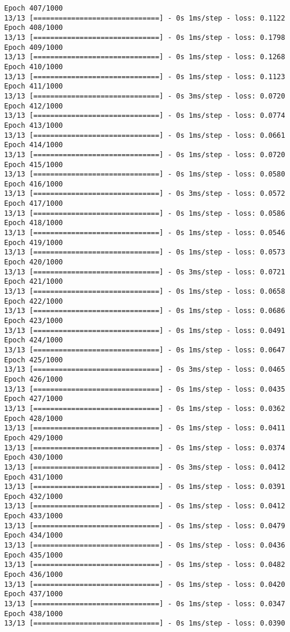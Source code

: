 \documentclass[11pt]{article}
\begin{document}
\begin{Verbatim}[commandchars=\\\{\}]
Epoch 407/1000
13/13 [==============================] - 0s 1ms/step - loss: 0.1122
Epoch 408/1000
13/13 [==============================] - 0s 1ms/step - loss: 0.1798
Epoch 409/1000
13/13 [==============================] - 0s 1ms/step - loss: 0.1268
Epoch 410/1000
13/13 [==============================] - 0s 1ms/step - loss: 0.1123
Epoch 411/1000
13/13 [==============================] - 0s 3ms/step - loss: 0.0720
Epoch 412/1000
13/13 [==============================] - 0s 1ms/step - loss: 0.0774
Epoch 413/1000
13/13 [==============================] - 0s 1ms/step - loss: 0.0661
Epoch 414/1000
13/13 [==============================] - 0s 1ms/step - loss: 0.0720
Epoch 415/1000
13/13 [==============================] - 0s 1ms/step - loss: 0.0580
Epoch 416/1000
13/13 [==============================] - 0s 3ms/step - loss: 0.0572
Epoch 417/1000
13/13 [==============================] - 0s 1ms/step - loss: 0.0586
Epoch 418/1000
13/13 [==============================] - 0s 1ms/step - loss: 0.0546
Epoch 419/1000
13/13 [==============================] - 0s 1ms/step - loss: 0.0573
Epoch 420/1000
13/13 [==============================] - 0s 3ms/step - loss: 0.0721
Epoch 421/1000
13/13 [==============================] - 0s 1ms/step - loss: 0.0658
Epoch 422/1000
13/13 [==============================] - 0s 1ms/step - loss: 0.0686
Epoch 423/1000
13/13 [==============================] - 0s 1ms/step - loss: 0.0491
Epoch 424/1000
13/13 [==============================] - 0s 1ms/step - loss: 0.0647
Epoch 425/1000
13/13 [==============================] - 0s 3ms/step - loss: 0.0465
Epoch 426/1000
13/13 [==============================] - 0s 1ms/step - loss: 0.0435
Epoch 427/1000
13/13 [==============================] - 0s 1ms/step - loss: 0.0362
Epoch 428/1000
13/13 [==============================] - 0s 1ms/step - loss: 0.0411
Epoch 429/1000
13/13 [==============================] - 0s 1ms/step - loss: 0.0374
Epoch 430/1000
13/13 [==============================] - 0s 3ms/step - loss: 0.0412
Epoch 431/1000
13/13 [==============================] - 0s 1ms/step - loss: 0.0391
Epoch 432/1000
13/13 [==============================] - 0s 1ms/step - loss: 0.0412
Epoch 433/1000
13/13 [==============================] - 0s 1ms/step - loss: 0.0479
Epoch 434/1000
13/13 [==============================] - 0s 1ms/step - loss: 0.0436
Epoch 435/1000
13/13 [==============================] - 0s 1ms/step - loss: 0.0482
Epoch 436/1000
13/13 [==============================] - 0s 1ms/step - loss: 0.0420
Epoch 437/1000
13/13 [==============================] - 0s 1ms/step - loss: 0.0347
Epoch 438/1000
13/13 [==============================] - 0s 1ms/step - loss: 0.0390

\end{Verbatim}
\end{document}
